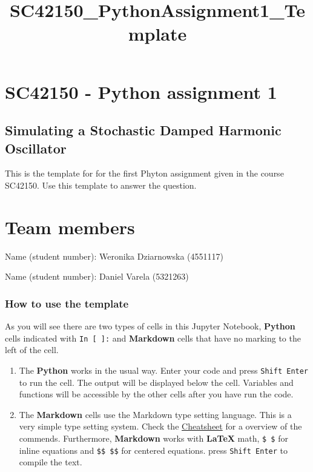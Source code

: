 \documentclass[11pt]{article}
\title{SC42150\_PythonAssignment1\_Template}
\begin{document}
    
    \maketitle
    
    

    
    \hypertarget{sc42150---python-assignment-1}{%
\section{SC42150 - Python assignment
1}\label{sc42150---python-assignment-1}}

\hypertarget{simulating-a-stochastic-damped-harmonic-oscillator}{%
\subsection{Simulating a Stochastic Damped Harmonic
Oscillator}\label{simulating-a-stochastic-damped-harmonic-oscillator}}

This is the template for for the first Phyton assignment given in the
course SC42150. Use this template to answer the question.

    \hypertarget{team-members}{%
\section{Team members}\label{team-members}}

Name (student number): Weronika Dziarnowska (4551117)

Name (student number): Daniel Varela (5321263)

    \hypertarget{how-to-use-the-template}{%
\subsubsection{How to use the template}\label{how-to-use-the-template}}

As you will see there are two types of cells in this Jupyter Notebook,
\textbf{Python} cells indicated with \texttt{In\ {[}\ {]}:} and
\textbf{Markdown} cells that have no marking to the left of the cell.

\begin{enumerate}
\def\labelenumi{\arabic{enumi}.}
\item
  The \textbf{Python} works in the usual way. Enter your code and press
  \texttt{Shift\ Enter} to run the cell. The output will be displayed
  below the cell. Variables and functions will be accessible by the
  other cells after you have run the code.
\item
  The \textbf{Markdown} cells use the Markdown type setting language.
  This is a very simple type setting system. Check the
  \href{https://github.com/adam-p/markdown-here/wiki/Markdown-Cheatsheet}{Cheatsheet}
  for a overview of the commends. Furthermore, \textbf{Markdown} works
  with \textbf{LaTeX} math, \texttt{\$\ \$} for inline equations and
  \texttt{\$\$\ \$\$} for centered equations. press
  \texttt{Shift\ Enter} to compile the text.
\end{enumerate}
\end{document}
